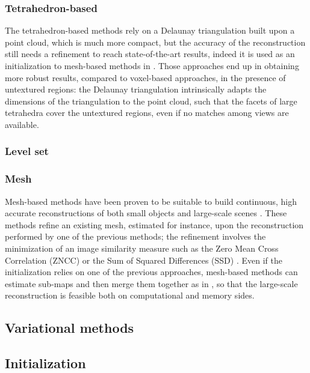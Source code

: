 \subsubsection{Tetrahedron-based}
The tetrahedron-based methods rely on a Delaunay triangulation built upon a point cloud, which is much more compact, but the accuracy of the reconstruction still needs a refinement to reach state-of-the-art results, indeed it is used as an initialization to mesh-based methods in \cite{vu_et_al_2012,hiep2009towards,salman2010surface}.
Those approaches end up in obtaining more robust results, compared to voxel-based approaches, in the presence of untextured regions: the Delaunay triangulation intrinsically adapts the dimensions of the triangulation to the point cloud, such that the facets of large tetrahedra cover the untextured regions, even if no matches among views are available.

\subsubsection{Level set}


\subsubsection{Mesh}
Mesh-based methods have been proven to be suitable to build continuous, high accurate reconstructions of both small objects and large-scale scenes \cite{hiep2009towards,vu_et_al_2012,salman2010surface,vu2011large}.
These methods refine an existing mesh, estimated for instance,  upon the reconstruction performed by one of the previous methods; the refinement involves the minimization of an image similarity measure such as the Zero Mean Cross Correlation (ZNCC) \cite{hiep2009towards,pons2007multi,zaharescu2007transformesh} or the Sum of Squared Differences (SSD) \cite{delaunoy_et_al_08,gargallo2007minimizing,delaunoy2011gradient}. 
Even if the initialization relies on one of the previous approaches, mesh-based methods can estimate sub-maps and then merge them together as in \cite{vu2011large}, so that the large-scale reconstruction is feasible both on computational and memory sides.


\subsection{Variational methods}
\subsection{Initialization}
